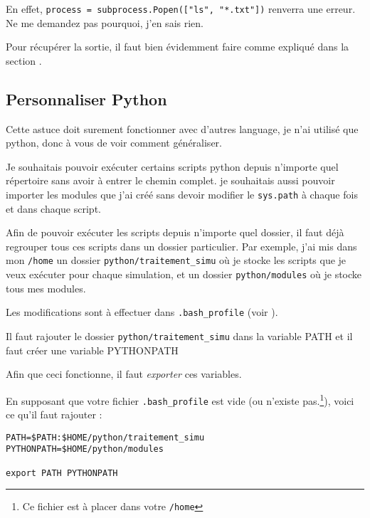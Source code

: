 \documentclass[a4paper,twoside]{article}
\begin{document}
En effet, \verb|process = subprocess.Popen(["ls", "*.txt"])| renverra une erreur. Ne me demandez pas pourquoi, j'en sais rien.

\begin{remarque}
Pour récupérer la sortie, il faut bien évidemment faire comme expliqué dans la section .
\end{remarque}

\subsection{Personnaliser Python}
Cette astuce doit surement fonctionner avec d'autres language, je  n'ai utilisé que python, donc à vous de voir comment généraliser.

Je souhaitais pouvoir exécuter certains scripts python depuis  n'importe quel répertoire sans avoir à entrer le chemin complet. je  souhaitais aussi pouvoir importer les modules que j'ai créé sans  devoir modifier le \texttt{sys.path} à chaque fois et dans chaque  script.

Afin de pouvoir exécuter les scripts depuis n'importe quel dossier,  il faut déjà regrouper tous ces scripts dans un dossier particulier.  Par exemple, j'ai mis dans mon \texttt{/home} un dossier \texttt {python/traitement\_simu} où je stocke les scripts que je veux  exécuter pour chaque simulation, et un dossier \texttt{python/modules} où je stocke tous mes modules.

Les modifications sont à effectuer dans \texttt{.bash\_profile} (voir  ).

Il faut rajouter le dossier \texttt{python/traitement\_simu} dans la  variable PATH et il faut créer une variable PYTHONPATH

\begin{attention}
Afin que ceci fonctionne, il faut \emph{exporter} ces variables.
\end{attention}

En supposant que votre fichier \texttt{.bash\_profile} est vide (ou  n'existe pas.\footnote{Ce fichier est à placer dans votre \texttt{/home}}), voici ce qu'il faut rajouter :
\begin{verbatim}
PATH=$PATH:$HOME/python/traitement_simu
PYTHONPATH=$HOME/python/modules

export PATH PYTHONPATH
\end{verbatim}


\printindex
\end{document}
